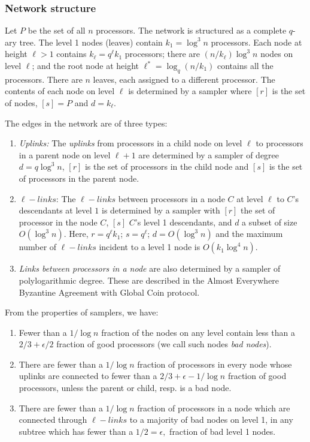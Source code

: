 \documentclass[letterpaper,11pt]{article}
\begin{document}
\subsubsection{Network structure}

Let $P$ be the set of all $n$ processors. 
The network is structured as a complete $q$-ary  tree. The level 1 nodes (leaves) contain $k_1=\log^3 n$ processors.  Each node at height $\ell >1$ contains $k_{\ell}=q^{\ell} k_1$ processors; there are $(n/ k_{\ell}) \log^3 n$ nodes on level $\ell$; and the root node at height $\ell^*=\log_q (n/k_1)$ contains all the processors.  There are $n$ leaves, each assigned to a different processor.  The contents of each node on level $\ell$ is determined by  a sampler where $[r] $ is the set of nodes, $[s]= P$ and $d =k_{\ell}$. 

The edges in the network are of three types:
\begin{enumerate}
\item
{\it Uplinks:}   The {\it uplinks}  from  processors in a child node on level $\ell$  to processors in a parent node on level $\ell+1$ are determined by a sampler
of degree  $d=q \log^3  n$, $[r]$ is the set of processors in the child node and $[s]$ is the set of processors in the parent node.  
\item
$ \ell-links$:  The $  \ell- links$  between  processors in a node $C$ at level $\ell$ to $C$'s descendants at level $1$ is determined by a sampler with $[r]$ the set of processor in the node $C$, $[s]$ $C$'s level 1 descendants, and $d$ a subset of size $O(\log^3 n)$.  Here, $r=q^{\ell} k_1$; $s=q^{\ell}$; $d=O(\log^3 n)$
and the maximum number of $\ell-links$ incident to  a level 1 node is $O(k_1 \log^4n)$.

\item
{\it Links between processors in a node} are also determined by a sampler of polylogarithmic degree. These are described in the Almost Everywhere Byzantine Agreement with Global Coin protocol. 
\end{enumerate}


From the properties of samplers,  we have: 
\begin{enumerate}
\item Fewer than a $1/\log n$ fraction of the nodes on any level contain less than a $2/3 + \epsilon/2$ fraction of good processors (we call such nodes {\it bad nodes}). 
\item  There are fewer than a $1/\log n$ fraction of processors in every node whose uplinks are connected to fewer than a $2/3 +\epsilon -1/\log n$ fraction of good processors, unless the parent or child, resp. is a bad node.
\item
There are fewer than a $1/\log n$ fraction of processors in a node which are connected  through $\ell-links$ to a majority of bad nodes on level 1, in any subtree which has fewer than a $1/2 =\epsilon,$ fraction of bad level 1 nodes. 
\end{enumerate}
\end{document}
